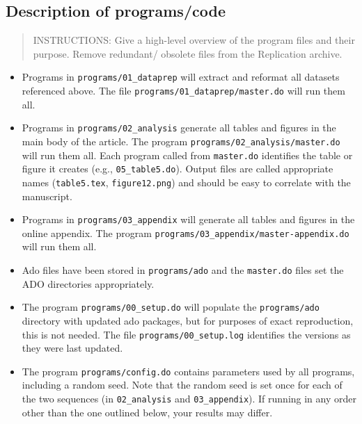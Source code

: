 \documentclass[
]{article}
\providecommand{\tightlist}{%
  \setlength{\itemsep}{0pt}\setlength{\parskip}{0pt}}
\begin{document}
\hypertarget{description-of-programscode}{%
\subsection{Description of
programs/code}\label{description-of-programscode}}

\begin{quote}
INSTRUCTIONS: Give a high-level overview of the program files and their
purpose. Remove redundant/ obsolete files from the Replication archive.
\end{quote}

\begin{itemize}
\tightlist
\item
  Programs in \texttt{programs/01\_dataprep} will extract and reformat
  all datasets referenced above. The file
  \texttt{programs/01\_dataprep/master.do} will run them all.
\item
  Programs in \texttt{programs/02\_analysis} generate all tables and
  figures in the main body of the article. The program
  \texttt{programs/02\_analysis/master.do} will run them all. Each
  program called from \texttt{master.do} identifies the table or figure
  it creates (e.g., \texttt{05\_table5.do}). Output files are called
  appropriate names (\texttt{table5.tex}, \texttt{figure12.png}) and
  should be easy to correlate with the manuscript.
\item
  Programs in \texttt{programs/03\_appendix} will generate all tables
  and figures in the online appendix. The program
  \texttt{programs/03\_appendix/master-appendix.do} will run them all.
\item
  Ado files have been stored in \texttt{programs/ado} and the
  \texttt{master.do} files set the ADO directories appropriately.
\item
  The program \texttt{programs/00\_setup.do} will populate the
  \texttt{programs/ado} directory with updated ado packages, but for
  purposes of exact reproduction, this is not needed. The file
  \texttt{programs/00\_setup.log} identifies the versions as they were
  last updated.
\item
  The program \texttt{programs/config.do} contains parameters used by
  all programs, including a random seed. Note that the random seed is
  set once for each of the two sequences (in \texttt{02\_analysis} and
  \texttt{03\_appendix}). If running in any order other than the one
  outlined below, your results may differ.
\end{itemize}
\end{document}
